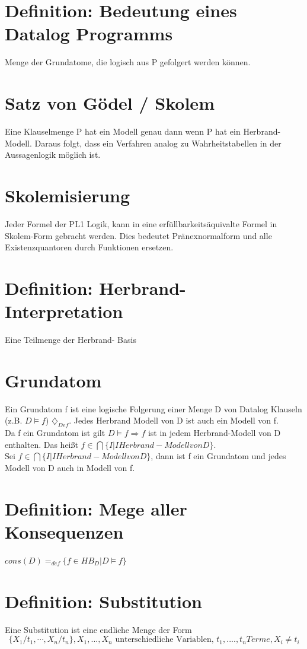 \documentclass[12pt, a4paper]{article}
\begin{document}
\section*{Definition: Bedeutung eines Datalog Programms}
Menge der Grundatome, die logisch aus P gefolgert werden können.


\section*{Satz von Gödel / Skolem}
Eine Klauselmenge P hat ein Modell genau dann wenn P hat ein Herbrand-Modell. Daraus folgt, dass ein Verfahren analog zu Wahrheitstabellen in der Aussagenlogik möglich ist.


\section*{Skolemisierung}
Jeder Formel der PL1 Logik, kann in eine erfüllbarkeitsäquivalte Formel in Skolem-Form gebracht werden. Dies bedeutet Pränexnormalform und alle Existenzquantoren durch Funktionen ersetzen.

\section*{Definition: Herbrand-Interpretation}
Eine Teilmenge der Herbrand- Basis

\section*{Grundatom}
Ein Grundatom f ist eine logische Folgerung einer Menge D von Datalog Klauseln (z.B. $D \vDash f$) $\diamondsuit_{Def}$. Jedes Herbrand Modell von D ist auch ein Modell von f.\\
Da f ein Grundatom ist gilt $D \vDash f \Longrightarrow f $ ist in jedem Herbrand-Modell von D enthalten. Das heißt $f \in \bigcap \{ I | I Herbrand-Modell von D \}$.\\
Sei $f \in \bigcap \{ I | I Herbrand-Modell von D \}$, dann ist f ein Grundatom und jedes Modell von D auch in Modell von f. 

\section*{Definition: Mege aller Konsequenzen}
$cons(D) =_{def} \{ f \in HB_D | D \vDash f \}$

\section*{Definition: Substitution}
Eine Substitution ist eine endliche Menge der Form
\begin{equation}
\{ X_1 / t_1, \cdots, X_n / t_n \}, X_1,...,X_n \text{ unterschiedliche Variablen, } t_1,....,t_n Terme, X_i \neq t_i
\end{equation}
\end{document}
